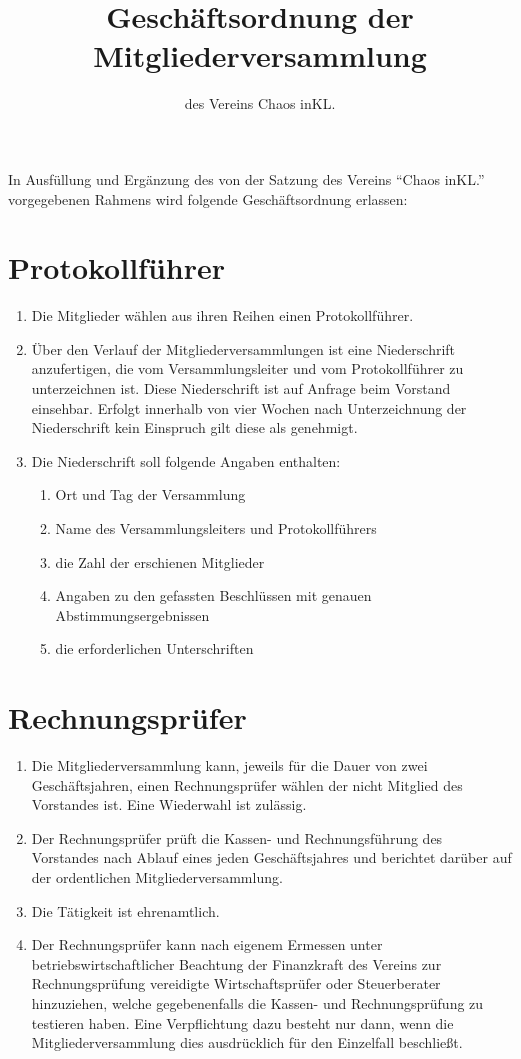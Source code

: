 \documentclass[a4paper, 12pt]{scrartcl}
\begin{document}
\title{Geschäftsordnung der Mitgliederversammlung}
\subtitle{des Vereins Chaos inKL.}
\author{}
\date{}

\maketitle

In Ausfüllung und Ergänzung des von der Satzung des Vereins "`Chaos
inKL."' vorgegebenen Rahmens wird folgende Geschäftsordnung erlassen:

\section{Protokollführer}
\begin{enumerate}
	\item Die Mitglieder wählen aus ihren Reihen einen Protokollführer.
	\item Über den Verlauf der Mitgliederversammlungen ist eine Niederschrift anzufertigen, die vom Versammlungsleiter und vom Protokollführer zu unterzeichnen ist. Diese Niederschrift ist auf Anfrage beim Vorstand einsehbar. Erfolgt innerhalb von vier Wochen nach Unterzeichnung der Niederschrift kein Einspruch gilt diese als genehmigt.
	\item Die Niederschrift soll folgende Angaben enthalten:
		\begin{enumerate}
	  	\item Ort und Tag der Versammlung
	    \item Name des Versammlungsleiters und Protokollführers
	    \item die Zahl der erschienen Mitglieder
	    \item Angaben zu den gefassten Beschlüssen mit genauen Abstimmungsergebnissen
	    \item die erforderlichen Unterschriften
		\end{enumerate}
\end{enumerate}

\section{Rechnungsprüfer}
\begin{enumerate}
	\item Die Mitgliederversammlung kann, jeweils für die Dauer von zwei
Geschäftsjahren, einen Rechnungsprüfer wählen der nicht Mitglied des
Vorstandes ist. Eine Wiederwahl ist zulässig.
	\item Der Rechnungsprüfer prüft die Kassen- und Rechnungsführung des
Vorstandes nach Ablauf eines jeden Geschäftsjahres und berichtet darüber
auf der ordentlichen Mitgliederversammlung.
	\item Die Tätigkeit ist ehrenamtlich.
	\item Der Rechnungsprüfer kann nach eigenem Ermessen unter
betriebswirtschaftlicher Beachtung der Finanzkraft des Vereins zur
Rechnungsprüfung vereidigte Wirtschaftsprüfer oder Steuerberater
hinzuziehen, welche gegebenenfalls die Kassen- und Rechnungsprüfung zu
testieren haben. Eine Verpflichtung dazu besteht nur dann, wenn die
Mitgliederversammlung dies ausdrücklich für den Einzelfall beschließt.
\end{enumerate}
\end{document}
